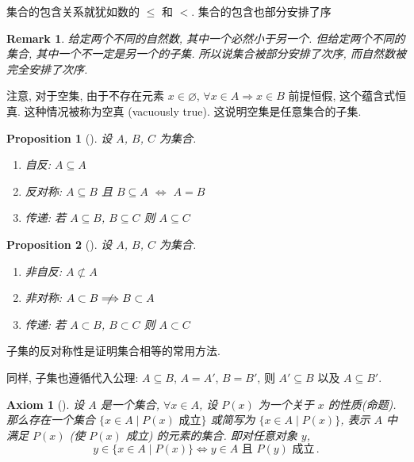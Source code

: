 \documentclass[UTF8]{ctexart}
\theoremstyle{mystyle}
\newtheorem{axiom}{Axiom}[section]
\newtheorem{proposition}{Proposition}[section]
\theoremstyle{myremark}
\newtheorem*{remark}{Remark}
\theoremstyle{plain}
\begin{document}
集合的包含关系就犹如数的 $ \leqslant $ 和 $ < $. 集合的包含也部分安排了序

\begin{remark}
    给定两个不同的自然数, 其中一个必然小于另一个. 但给定两个不同的集合, 其中一个不一定是另一个的子集. 所以说集合被部分安排了次序, 而自然数被完全安排了次序.
\end{remark}

注意, 对于空集, 由于不存在元素 $ x \in \varnothing $, $ \forall x \in A \Longrightarrow x \in B $ 前提恒假, 这个蕴含式恒真. 这种情况被称为空真 (vacuously true). 这说明空集是任意集合的子集.

\begin{proposition}[]
    设 $ A $, $ B $, $ C $ 为集合. 
    \begin{enumerate}
        \item 自反: $ A \subseteq A $
        \item 反对称: $ A \subseteq B $ 且 $ B \subseteq A $ $ \Longleftrightarrow $ $ A = B $
        \item 传递: 若 $ A \subseteq B $, $ B \subseteq C $ 则 $ A \subseteq C $
    \end{enumerate}
\end{proposition}

\begin{proposition}[]
    设 $ A $, $ B $, $ C $ 为集合. 
    \begin{enumerate}
        \item 非自反: $ A \not\subset A $
        \item 非对称: $ A \subset B \centernot \Longrightarrow B \subset A $ 
        \item 传递: 若 $ A \subset B $, $ B \subset C $ 则 $ A \subset C $
    \end{enumerate}
\end{proposition}

子集的反对称性是证明集合相等的常用方法.

同样, 子集也遵循代入公理: $ A \subseteq B $, $ A = A' $, $ B = B' $, 则 $ A' \subseteq B $ 以及 $ A \subseteq B' $.

\begin{axiom}[]
    设 $ A $ 是一个集合, $ \forall x \in A $, 设 $ P(x) $ 为一个关于 $ x $ 的性质(命题). 那么存在一个集合 $ \{ x \in A \mid P(x) \text{ 成立} \} $ 或简写为 $ \{ x \in A \mid P(x) \} $, 表示 $ A $ 中满足 $ P(x) $ (使 $ P(x) $ 成立) 的元素的集合. 即对任意对象 $ y $, \[ y \in \{x \in A \mid P(x)\} \Longleftrightarrow y \in A \text{ 且 } P(y) \text{ 成立} \,.\]
\end{axiom}
\end{document}
